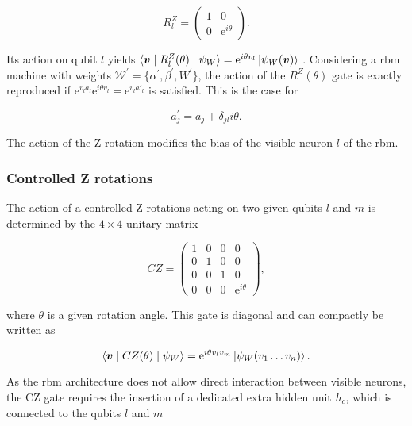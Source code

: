 \begin{equation}
    R_l^Z=
    \begin{pmatrix}
        1 & 0 \\
        0 & \mathrm{e}^{i\theta}
    \end{pmatrix} .
\end{equation}

Its action on qubit $l$ yields 
$\langle \bm{v} \mid R_{l}^{Z}(\theta) \mid \psi_{W}  \rangle = 
\mathrm{e}^{i\theta v_{l}} \Ket{\psi_{W}(\bm{v})}
$
. Considering a \gls{rbm} machine with weights $\mathcal{W}^{\prime} = \{\alpha^{\prime},\beta^{\prime},W^{\prime}\}$, the action of the $R^{Z}(\theta)$
gate is exactly reproduced if $\mathrm{e}^{v_{l}a_{l}}\mathrm{e}^{i\theta v_{l}} = \mathrm{e}^{v_{l}a\prime_{l}}$
is satisfied. This is the case for

\begin{equation}
    a^{\prime}_{j} = a_{j} + \delta_{jl}i\theta.
\end{equation}

The action of the Z rotation modifies the bias of the visible neuron $l$ of the \gls{rbm}.

\subsubsection{Controlled Z rotations}
The action of a controlled Z rotations acting on two given qubits $l$ and $m$ is determined by
the $4\times4$ unitary matrix

\begin{equation}
    CZ =
    \begin{pmatrix}
        1 & 0 & 0 & 0 \\
        0 & 1 & 0 & 0 \\
        0 & 0 & 1 & 0 \\
        0 & 0 & 0 & \mathrm{e}^{i\theta}
    \end{pmatrix},
\end{equation}

where $\theta$ is a given rotation angle. This gate is diagonal and can compactly be written as

\begin{equation}
    \langle \bm{v} \mid CZ(\theta) \mid \psi_{W}  \rangle = 
    \mathrm{e}^{i\theta v_{l}v_{m}}\Ket{\psi_{W}(v_{1} \dots v_{n})}.
\end{equation}

As the \gls{rbm} architecture does not allow direct interaction between visible neurons, the CZ gate
requires the insertion of a dedicated extra hidden unit $h_{c}$, which is connected
to the qubits $l$ and $m$

